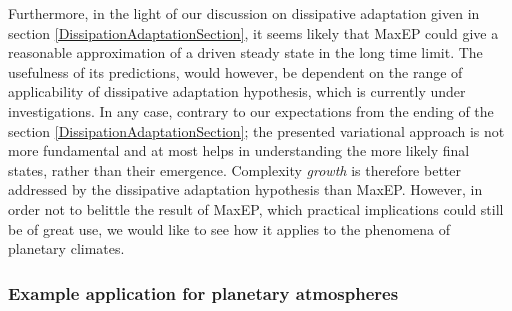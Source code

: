 \documentclass[a4paper,12pt]{article}
\begin{document}
Furthermore, in the light of our discussion on dissipative adaptation given in section \ref{DissipationAdaptationSection}, it seems likely that MaxEP could give a reasonable approximation of a driven steady state in the long time limit. The usefulness of its predictions, would however, be dependent on the range of applicability of dissipative adaptation hypothesis, which is currently under investigations.
In any case, contrary to our expectations from the ending of the section \ref{DissipationAdaptationSection}; the presented variational approach is not more fundamental and at most helps in understanding the more likely final states, rather than their emergence. Complexity \textit{growth} is therefore better addressed by the dissipative adaptation hypothesis than MaxEP.
However, in order not to belittle the result of MaxEP, which practical implications could still be of great use, we would like to see how it applies to the phenomena of planetary climates.

\subsubsection{Example application for planetary atmospheres}
\end{document}
